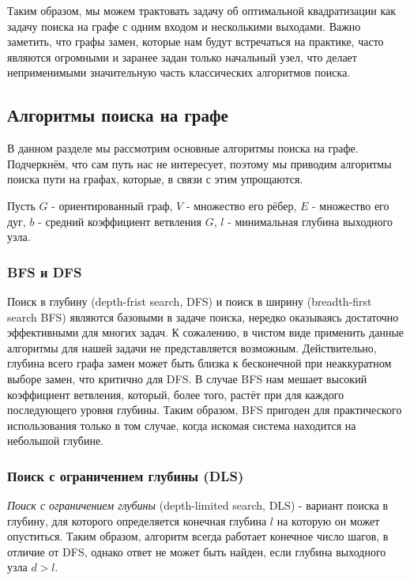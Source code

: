 Таким образом, мы можем трактовать задачу об оптимальной квадратизации как задачу поиска на графе с одним входом и несколькими выходами. Важно заметить, что графы замен, которые нам будут встречаться на практике, часто являются огромными и заранее задан только начальный узел, что делает неприменимыми значительную часть классических алгоритмов поиска.

\subsection{Алгоритмы поиска на графе} \label{sec:search-algo}

В данном разделе мы рассмотрим основные алгоритмы поиска на графе. Подчеркнём, что сам путь нас не интересует, поэтому мы приводим алгоритмы поиска пути на графах, которые, в связи с этим упрощаются.

Пусть $G$ - ориентированный граф, $V$ - множество его рёбер, $E$ - множество его дуг, $b$ - средний коэффициент ветвления $G$, $l$ - минимальная глубина выходного узла.

\subsubsection{BFS и DFS} \label{sec:BFS-DFS}

Поиск в глубину (depth-frist search, DFS) и поиск в ширину (breadth-first search BFS) являются базовыми в задаче поиска, нередко оказываясь достаточно эффективными для многих задач. К сожалению, в чистом виде применить данные алгоритмы для нашей задачи не представляется возможным. Действительно, глубина всего графа замен может быть близка к бесконечной при неаккуратном выборе замен, что критично для DFS. В случае BFS нам мешает высокий коэффициент ветвления, который, более того, растёт при для каждого последующего уровня глубины. Таким образом, BFS пригоден для практического использования только в том случае, когда искомая система находится на небольшой глубине. 

\subsubsection{Поиск с ограничением глубины (DLS)} \label{sec:DLS}

\begin{definition}
    \textit{Поиск с ограничением глубины} (depth-limited search, DLS) - вариант поиска в глубину, для которого определяется конечная глубина $l$ на которую он может опуститься. Таким образом, алгоритм всегда работает конечное число шагов, в отличие от DFS, однако ответ не может быть найден, если глубина выходного узла $d > l$.
\end{definition}

